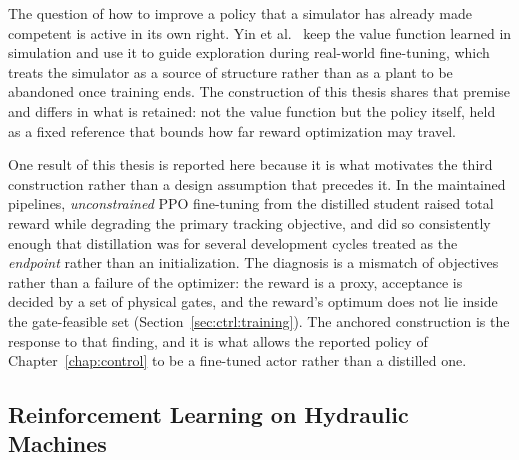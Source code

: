 The question of how to improve a policy that a simulator has already
made competent is active in its own right. Yin et
al.~\cite{yin2025rapidly} keep the value function learned in simulation
and use it to guide exploration during real-world fine-tuning, which
treats the simulator as a source of structure rather than as a plant to
be abandoned once training ends. The construction of this thesis shares
that premise and differs in what is retained: not the value function but
the policy itself, held as a fixed reference that bounds how far reward
optimization may travel.

One result of this thesis is reported here because it is what motivates
the third construction rather than a design assumption that precedes it.
In the maintained pipelines, \emph{unconstrained} PPO fine-tuning from
the distilled student raised total reward while degrading the primary
tracking objective, and did so consistently enough that distillation was
for several development cycles treated as the \emph{endpoint} rather
than an initialization. The diagnosis is a mismatch of objectives rather
than a failure of the optimizer: the reward is a proxy, acceptance is
decided by a set of physical gates, and the reward's optimum does not
lie inside the gate-feasible set (Section~\ref{sec:ctrl:training}).
The anchored construction is the response to that finding, and
it is what allows the reported \ppoROM{} policy of
Chapter~\ref{chap:control} to be a fine-tuned actor rather than a
distilled one.

\subsection{Reinforcement Learning on Hydraulic Machines}

